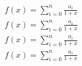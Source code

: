 \documentclass[12pt, a4paper, twopage]{scrartcl}
\begin{document}
\begin{eqnarray*}
	f(x) = \sum_{i=0}^{n} \frac{a_i}{1+x} \\
	\textstyle f(x) = \textstyle \sum_{i=0}^{n} \frac{a_i}{1+x} \\
	\scriptstyle f(x) = \scriptstyle \sum_{i=0}^{n} \frac{a_i}{1+x} \\
	\scriptscriptstyle f(x) = \scriptscriptstyle \sum_{i=0}^{n} \frac{a_i}{1+x}
\end{eqnarray*}
















\clearpage
\end{document}
